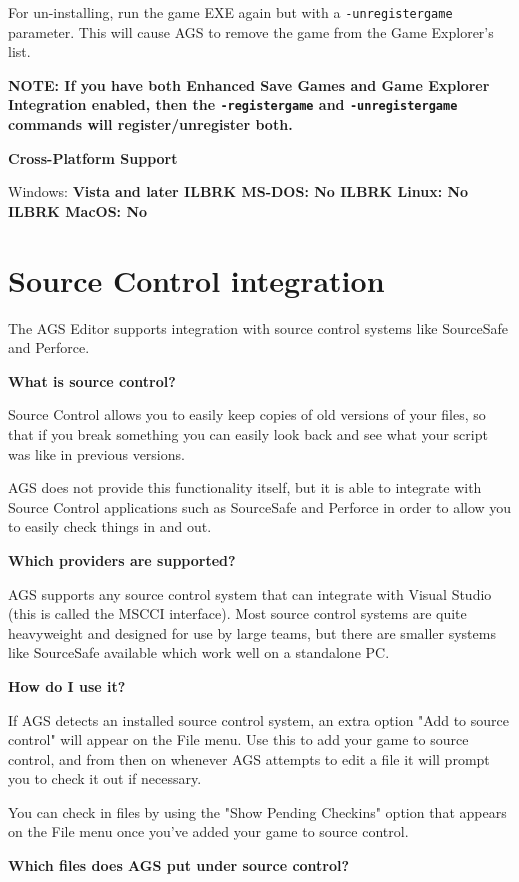 For un-installing, run the game EXE again but with a  \verb$-unregistergame$  parameter.
This will cause AGS to remove the game from the Game Explorer's list.

\bf{NOTE:} If you have both Enhanced Save Games and Game Explorer Integration enabled,
then the \verb$-registergame$ and \verb$-unregistergame$ commands will register/unregister
both.

\bf{Cross-Platform Support}

Windows: \bf{ Vista and later }ILBRK
MS-DOS: \bf{ No }ILBRK
Linux: \bf{ No }ILBRK
MacOS: \bf{ No }


\section{Source Control integration}\label{SourceControl}%

The AGS Editor supports integration with source control systems like SourceSafe and Perforce.

\bf{What is source control?}

Source Control allows you to easily keep copies of old versions of your files, so that
if you break something you can easily look back and see what your script was like
in previous versions.

AGS does not provide this functionality itself, but it is able to integrate with
Source Control applications such as SourceSafe and Perforce in order to allow you
to easily check things in and out.

\bf{Which providers are supported?}

AGS supports any source control system that can integrate with Visual Studio
(this is called the MSCCI interface). Most source control systems are quite
heavyweight and designed for use by large teams, but there are smaller
systems like SourceSafe available which work well on a standalone PC.

\bf{How do I use it?}

If AGS detects an installed source control system, an extra option "Add to
source control" will appear on the File menu. Use this to add your game to
source control, and from then on whenever AGS attempts to edit a file it
will prompt you to check it out if necessary.

You can check in files by using the "Show Pending Checkins" option that
appears on the File menu once you've added your game to source control.

\bf{Which files does AGS put under source control?}

